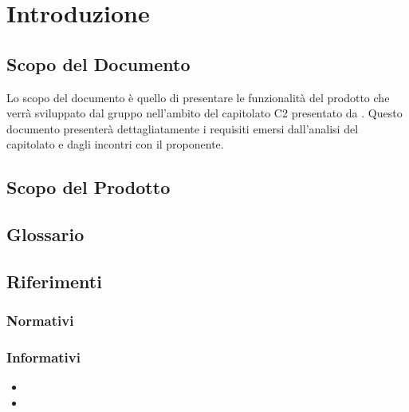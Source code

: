 \section{Introduzione}
\label{sec:Introduzione}

	\subsection{Scopo del Documento}
	\label{sub:ScopoDocumento}
	
	Lo scopo del documento è quello di presentare le funzionalità del prodotto che verrà sviluppato dal gruppo \AUTORE{} nell'ambito del capitolato C2 presentato da \PROPONENTE. Questo documento presenterà dettagliatamente i requisiti emersi dall'analisi del capitolato e dagli incontri con il proponente.
	
	\subsection{Scopo del Prodotto}
	\label{sub:ScopoProdotto}
		\SCOPO
	
	\subsection{Glossario}
	\label{sub:Glossario}
		\GLOSSARIO
		
	
	\subsection{Riferimenti}
	\label{sub:Riferimenti}
		\subsubsection{Normativi}
			\NORMATIVI
		\subsubsection{Informativi}
			\begin{itemize}
				\item 
				\item
			\end{itemize}
		
